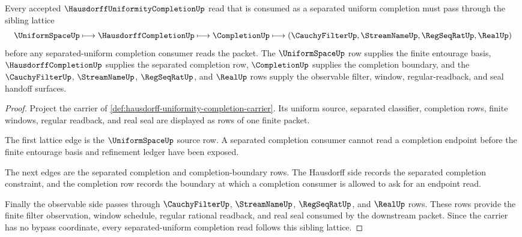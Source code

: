 \begin{theorem}
\label{thm:hausdorff-uniformity-completion-sibling-lattice}
Every accepted $\HausdorffUniformityCompletionUp$ read that is consumed as a separated uniform completion must pass through the sibling lattice
$$
\UniformSpaceUp\longmapsto\HausdorffCompletionUp\longmapsto\CompletionUp\longmapsto(\CauchyFilterUp,\StreamNameUp,\RegSeqRatUp,\RealUp)
$$
before any separated-uniform completion consumer reads the packet. The $\UniformSpaceUp$ row supplies the finite entourage basis, $\HausdorffCompletionUp$ supplies the separated completion row, $\CompletionUp$ supplies the completion boundary, and the $\CauchyFilterUp$, $\StreamNameUp$, $\RegSeqRatUp$, and $\RealUp$ rows supply the observable filter, window, regular-readback, and seal handoff surfaces.
\end{theorem}
\begin{proof}
Project the carrier of \autoref{def:hausdorff-uniformity-completion-carrier}. Its uniform source, separated classifier, completion rows, finite windows, regular readback, and real seal are displayed as rows of one finite packet.

The first lattice edge is the $\UniformSpaceUp$ source row. A separated completion consumer cannot read a completion endpoint before the finite entourage basis and refinement ledger have been exposed.

The next edges are the separated completion and completion-boundary rows. The Hausdorff side records the separated completion constraint, and the completion row records the boundary at which a completion consumer is allowed to ask for an endpoint read.

Finally the observable side passes through $\CauchyFilterUp$, $\StreamNameUp$, $\RegSeqRatUp$, and $\RealUp$ rows. These rows provide the finite filter observation, window schedule, regular rational readback, and real seal consumed by the downstream packet. Since the carrier has no bypass coordinate, every separated-uniform completion read follows this sibling lattice.
\end{proof}
